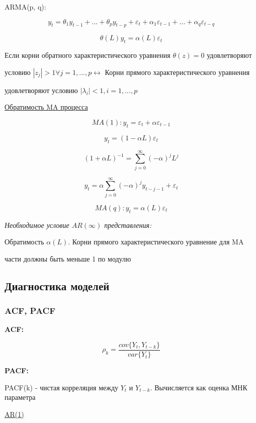 \documentclass[a4paper, 12pt]{article}
\begin{document}
ARMA(p, q):

\[
y_{t} = \theta_{1}y_{t - 1} + ... + \theta_{p}y_{t - p} + \varepsilon_{t} + \alpha_{1}\varepsilon_{t - 1} + ... + \alpha_{q}\varepsilon_{t - q}
\]

\[\theta(L)y_{t} = \alpha(L)\varepsilon_{t}\]

Если корни обратного характеристического уравнения $\theta(z) = 0$ удовлетворяют 

условию $|z_{j}| > 1 \forall j=1,...,p \leftrightarrow$ Корни прямого характеристического уравнения 

удовлетворяют условию $|\lambda_{i}| < 1, i=1, ..., p$

\begin{center}
    \underline{Обратимость MA процесса}
\end{center}
\[MA(1): y_{t} = \varepsilon_{t} + \alpha \varepsilon_{t - 1}\]

\[y_{t} = (1 - \alpha L)\varepsilon_{t}\]

\[(1 + \alpha L)^{-1} = \sum_{j = 0}^{\infty}(-\alpha)^{j}L^{j}\]

\[y_{t} = \alpha \sum_{j = 0}^{\infty} (-\alpha)^{j}y_{t - j - 1} +\varepsilon_{t}\]

\[MA(q): y_{t} = \alpha(L)\varepsilon_{t}\]


\textit{Необходимое условие $AR(\infty)$ представления:}

Обратимость $\alpha(L)$. Корни прямого характеристического уравнение для MA 

части должны быть меньше 1 по модулю

\subsection{Диагностика моделей}

\subsubsection{ACF, PACF}

\textbf{ACF:}

\[\rho_{k} = \frac{cov\{Y_{t}, Y_{t - k}\}}{var\{Y_{t}\}}\]

\textbf{PACF:}

PACF(k) - чистая корреляция между $Y_{t}$ и $Y_{t - k}$. Вычисляется как оценка МНК параметра

\begin{center}
    \underline{AR(1)}
\end{center}
\end{document}
